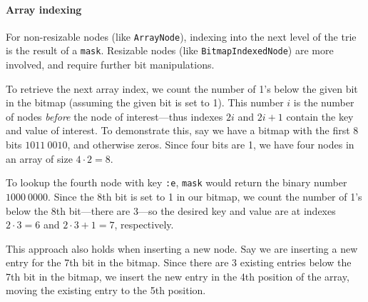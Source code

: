 \documentclass[preprint]{sigplanconf}
\begin{document}
\paragraph{Array indexing}

For non-resizable nodes (like \texttt{ArrayNode}),
indexing into the next level of the trie
is the result of a \texttt{mask}.
Resizable nodes (like \texttt{BitmapIndexedNode})
are more involved,
and require further bit manipulations.

To retrieve the next array index, we count the number of 1's
below the given bit in the bitmap (assuming the given
bit is set to 1).
This number $i$ is the number of nodes \textit{before}
the node of interest---thus indexes $2i$ and $2i+1$
contain the key and value of interest.
To demonstrate this, say we have a bitmap
with the first 8 bits $1011\ 0010$, and
otherwise zeros.
Since four bits are 1, we have four nodes
in an array of size $4\cdot2=8$.



To lookup the fourth node with key \texttt{:e},
\texttt{mask} would return the binary number
$1000\ 0000$.
Since the 8th bit is set to 1 in our bitmap,
we count the number of 1's below the 
8th bit---there are 3---so the desired key and value are at
indexes
$2\cdot3=6$
and
$2\cdot3+1=7$,
respectively.

This approach also holds when inserting a new node.
Say we are inserting a new entry
for the 7th bit in the bitmap.
Since there are 3 existing entries below
the 7th bit in the bitmap, we insert
the new entry in
the 4th position of the array, moving the 
existing entry to the 5th position.
\end{document}
